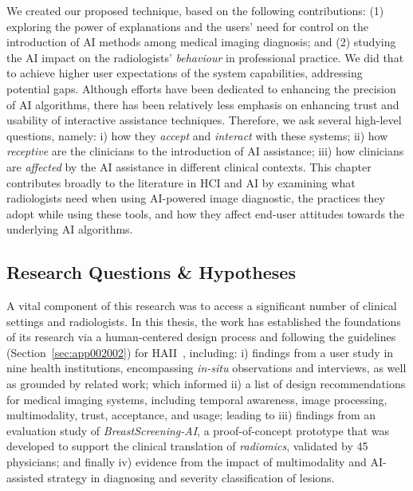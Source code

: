 We created our proposed technique, based on the following contributions:
(1) exploring the power of explanations and the users' need for control on the introduction of \ac{AI} methods among medical imaging diagnosis; and
(2) studying the \ac{AI} impact on the radiologists' {\it behaviour} in professional practice.
We did that to achieve higher user expectations of the system capabilities, addressing potential gaps.
Although efforts have been dedicated to enhancing the precision of \ac{AI} algorithms, there has been relatively less emphasis on enhancing trust and usability of interactive assistance techniques.
Therefore, we ask several high-level questions, namely:
i) how they {\it accept} and {\it interact} with these systems;
ii) how {\it receptive} are the clinicians to the introduction of \ac{AI} assistance;
iii) how clinicians are {\it affected} by the \ac{AI} assistance in different clinical contexts.
This chapter contributes broadly to the literature in \ac{HCI} and \ac{AI} by examining what radiologists need when using \ac{AI}-powered image diagnostic, the practices they adopt while using these tools, and how they affect end-user attitudes towards the underlying \ac{AI} algorithms.

\subsection{Research Questions \& Hypotheses}
\label{sec:chap005001002}

A vital component of this research was to access a significant number of clinical settings and radiologists.
In this thesis, the work has established the foundations of its research via a human-centered design process and following the guidelines (Section~\ref{sec:app002002}) for \ac{HAII}~\cite{10.1145/3313831.3376718, 10.1145/3290605.3300233, 10.1145/3290605.3300234, Kocielnik:2019:YAI:3290605.3300641}, including:
i) findings from a user study in nine health institutions, encompassing {\it in-situ} observations and interviews, as well as grounded by related work; which informed
ii) a list of design recommendations for medical imaging systems, including temporal awareness, image processing, multimodality, trust, acceptance, and usage; leading to
iii) findings from an evaluation study of {\it BreastScreening-AI}, a proof-of-concept prototype that was developed to support the clinical translation of {\it radiomics}, validated by 45 physicians; and finally
iv) evidence from the impact of multimodality and \ac{AI}-assisted strategy in diagnosing and severity classification of lesions.

